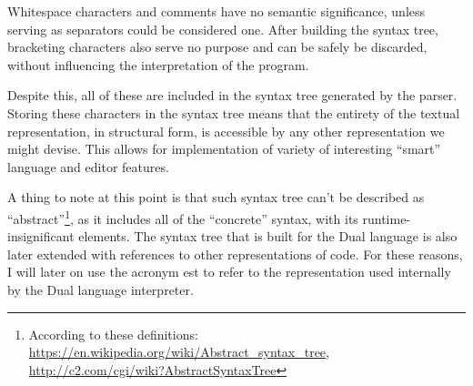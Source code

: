 Whitespace characters and comments have no semantic significance, unless serving as separators could be considered one. After building the syntax tree, bracketing characters also serve no purpose and can be safely be discarded, without influencing the interpretation of the program.

Despite this, all of these are included in the syntax tree generated by the parser. Storing these characters in the syntax tree means that the entirety of the textual representation, in structural form, is accessible by any other representation we might devise. This allows for implementation of variety of interesting ``smart'' language and editor features.

A thing to note at this point is that such syntax tree can't be described as ``abstract''\footnote{According to these definitions: \url{https://en.wikipedia.org/wiki/Abstract_syntax_tree}, \url{http://c2.com/cgi/wiki?AbstractSyntaxTree}}, as it includes all of the ``concrete'' syntax, with its runtime-insignificant elements. The syntax tree that is built for the Dual language is also later extended with references to other representations of code. For these reasons, I will later on use the acronym \acrlong{est} to refer to the representation used internally by the Dual language interpreter.

